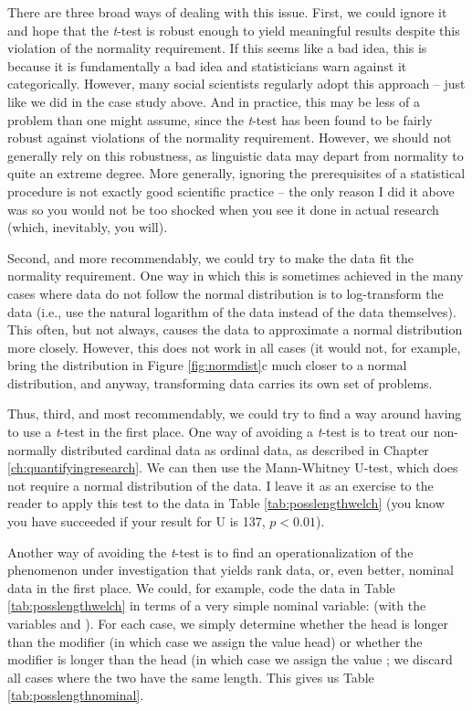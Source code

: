 There are three broad ways of dealing with this issue. First, we could ignore it and hope that the \textit{t}-test is robust enough to yield meaningful results despite this violation of the normality requirement. If this seems like a bad idea, this is because it is fundamentally a bad idea and statisticians warn against it categorically. However, many social scientists regularly adopt this approach -- just like we did in the case study above. And in practice, this may be less of a problem than one might assume, since the \textit{t}-test has been found to be fairly robust against violations of the normality requirement. However, we should not generally rely on this robustness, as linguistic data may depart from normality to quite an extreme degree. More generally, ignoring the prerequisites of a statistical procedure is not exactly good scientific practice -- the only reason I did it above was so you would not be too shocked when you see it done in actual research (which, inevitably, you will).

Second, and more recommendably, we could try to make the data fit the normality requirement. One way in which this is sometimes achieved in the many cases where data do not follow the normal distribution is to log-transform the data (i.e., use the natural logarithm of the data instead of the data themselves). This often, but not always, causes the data to approximate a normal distribution more closely. However, this does not work in all cases (it would not, for example, bring the distribution in Figure \ref{fig:normdist}c much closer to a normal distribution, and anyway, transforming data carries its own set of problems.

Thus, third, and most recommendably, we could try to find a way around having to use a \textit{t}-test in the first place. One way of avoiding a \textit{t}-test is to treat our non-normally distributed cardinal data as ordinal data, as described in Chapter \ref{ch:quantifyingresearch}. We can then use the Mann-Whitney U-test, which does not require a normal distribution of the data. I leave it as an exercise to the reader to apply this test to the data in Table \ref{tab:posslengthwelch} (you know you have succeeded if your result for U is 137, $p < 0.01$).

Another way of avoiding the \textit{t}-test is to find an operationalization of the phenomenon under investigation that yields rank data, or, even better, nominal data in the first place. We could, for example, code the data in Table \ref{tab:posslengthwelch} in terms of a very simple nominal variable:  (with the variables  and ). For each case, we simply determine whether the head is longer than the modifier (in which case we assign the value head) or whether the modifier is longer than the head (in which case we assign the value ; we discard all cases where the two have the same length. This gives us Table \ref{tab:posslengthnominal}.

